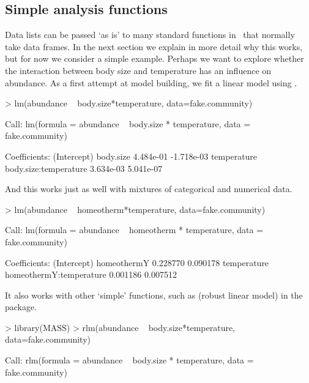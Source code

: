 \documentclass[a4paper]{report}
\begin{document}
\begin{article}
\section{Simple analysis functions}

Data lists can be passed `as is' to many standard functions in \R\ that normally take data frames.  In the next section we explain in more detail why this works, but for now we consider a simple example.  Perhaps we want to explore whether the interaction between body size and temperature has an influence on abundance.  As a first attempt at model building, we fit a linear model using .
\begin{Schunk}
\begin{Sinput}
> lm(abundance ~ body.size*temperature,
 data=fake.community)
\end{Sinput}
\begin{Soutput}
Call:
lm(formula = abundance ~ body.size * temperature, 
    data = fake.community)

Coefficients:
          (Intercept)              body.size  
            4.484e-01             -1.718e-03  
          temperature  body.size:temperature  
            3.634e-03              5.041e-07  
\end{Soutput}
\end{Schunk}
And this works just as well with mixtures of categorical and numerical data.
\begin{Schunk}
\begin{Sinput}
> lm(abundance ~ homeotherm*temperature,
 data=fake.community)
\end{Sinput}
\begin{Soutput}
Call:
lm(formula = abundance ~ homeotherm * temperature, 
    data = fake.community)

Coefficients:
            (Intercept)              homeothermY  
               0.228770                 0.090178  
            temperature  homeothermY:temperature  
               0.001186                 0.007512  
\end{Soutput}
\end{Schunk}
It also works with other `simple' functions, such as  (robust linear model) in the  package.
\begin{Schunk}
\begin{Sinput}
> library(MASS)
> rlm(abundance ~ body.size*temperature,
 data=fake.community)
\end{Sinput}
\begin{Soutput}
Call:
rlm(formula = abundance ~ body.size * temperature, 
    data = fake.community)


\end{Soutput}
\end{Schunk}
\end{article}
\end{document}
